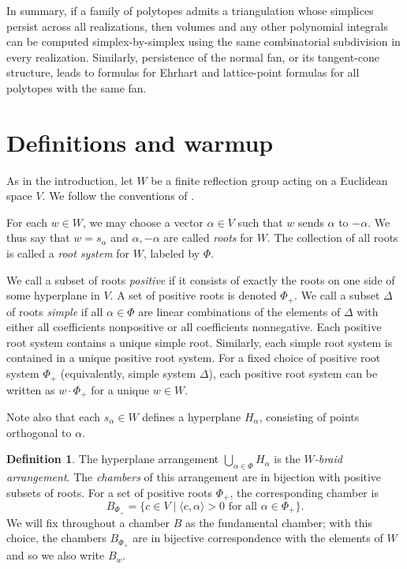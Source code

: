 \documentclass{amsart}
\theoremstyle{definition}
\newtheorem{defn}[thm]{Definition}
\begin{document}
In summary, if a family of polytopes admits a triangulation whose simplices persist across all realizations, then volumes and any other polynomial integrals can be computed simplex-by-simplex using the same combinatorial subdivision in every realization. Similarly, persistence of the normal fan, or its tangent-cone structure, leads to formulas for Ehrhart and lattice-point formulas for all polytopes with the same fan. 





\section{Definitions and warmup} \label{warmup}
 As in the introduction, let $W$ be a finite reflection group acting on a Euclidean space $V$. We follow the conventions of \cite{Humphreys90}.


For each $w\in W$, we may choose a vector $\alpha\in V$ such that $w$ sends $\alpha$ to $-\alpha$. We thus say that $w=s_\alpha$ and $\alpha, - \alpha$ are called \emph{roots} for $W$. The collection of all roots is called a \emph{root system} for $W$, labeled by $\Phi$.

We call a subset of roots \emph{positive} if it consists of exactly the roots on one side of some hyperplane in $V$. A set of positive roots is denoted $\Phi_+$. We call a subset $\Delta$ of roots \emph{simple} if all $\alpha\in \Phi$ are linear combinations of the elements of $\Delta$ with either all coefficients nonpositive or all coefficients nonnegative. Each positive root system contains a unique simple root. Similarly, each simple root system is contained in a unique positive root system. For a fixed choice of positive root system $\Phi_+$ (equivalently, simple system $\Delta$), each positive root system can be written as $w \cdot \Phi_+$ for a unique $w\in W$.


 Note also that each $s_\alpha\in W$ defines a hyperplane $H_\alpha$, consisting of points orthogonal to $\alpha$.

 \begin{defn}
     The hyperplane arrangement $\bigcup_{\alpha \in \Phi}H_\alpha$ is the \emph{$W$-braid arrangement}. The \emph{chambers} of this arrangement are in bijection with positive subsets of roots. For a set of positive roots $\Phi_+$, the corresponding chamber is \[B_{\Phi_+}=\{c\in V\mid \langle c,\alpha\rangle>0 \text{ for all }\alpha\in\Phi_+\}.\] 
     We will fix throughout a chamber $B$ as the fundamental chamber; with this choice, the chambers $B_{\Phi_+}$ are in bijective correspondence with the elements of $W$ and so we also write $B_w$.
 \end{defn}
\end{document}
